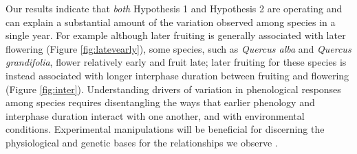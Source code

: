 \documentclass{article}
\begin{document}
\par Our results indicate that \textit{both} Hypothesis 1 and Hypothesis 2 are operating and can explain a substantial amount of the variation observed among species in a single year. For example although later fruiting is generally associated with later flowering (Figure \ref{fig:latevearly}), some species, such as \textit{Quercus alba} and \textit{Quercus grandifolia}, flower relatively early and fruit late; later fruiting for these species is instead associated with longer interphase duration between fruiting and flowering (Figure \ref{fig:inter}).  Understanding drivers of variation in phenological responses among species requires disentangling the ways that earlier phenology and interphase duration interact with one another, and with environmental conditions. Experimental manipulations will be beneficial for discerning the physiological and genetic bases for the relationships we observe \citep{flint1974}.
\end{document}
